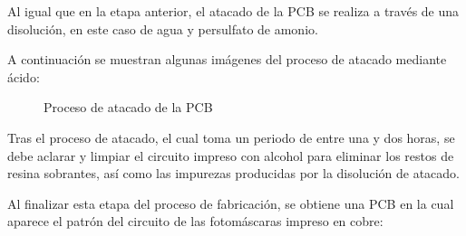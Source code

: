 \begin{itemize}
   Al igual que en la etapa anterior, el atacado de la \ac{PCB} se realiza a través de una disolución, en este caso de agua y persulfato de amonio.
   
   A continuación se muestran algunas imágenes del proceso de atacado mediante ácido:
   
   \begin{figure}[H]
    \centering
    \caption{Proceso de atacado de la \ac{PCB}}
    \label{fig:lego}
    \end{figure}
    
    Tras el proceso de atacado, el cual toma un periodo de entre una y dos horas, se debe aclarar y limpiar el circuito impreso con alcohol para eliminar los restos de resina sobrantes, así como las impurezas producidas por la disolución de atacado.
    
    Al finalizar esta etapa del proceso de fabricación, se obtiene una \ac{PCB} en la cual aparece el patrón del circuito de las fotomáscaras impreso en cobre:
    

\end{itemize}
